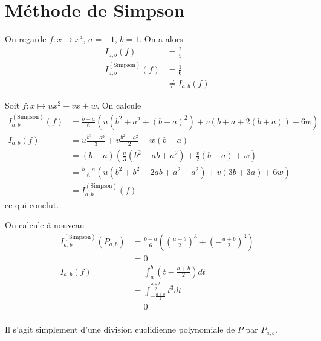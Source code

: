 
\section*{Méthode de Simpson}

\ques On regarde $ f: x \mapsto x^4 $, $ a=-1 $, $ b=1 $. On a alors 
\begin{align*}
    I_{a, b}(f) &= \frac{2}{5}\\
    I^{(\textrm{Simpson})}_{a, b}(f) &= \frac{1}{6}\\
                                     &\neq I_{a, b}(f)
\end{align*}

\ques Soit $ f : x \mapsto ux^2 + vx + w $. On calcule 
\begin{align*}
    I^{(\textrm{Simpson})}_{a, b}(f) &= \frac{b-a}{6} \left( u(b^2 + a^2 + (b+a)^2) + v(b + a + 2(b+a)) + 6w \right)\\
    I_{a, b}(f) &= u \frac{b^3 - a^3}{3} + v \frac{b^2-a^2}{2} + w(b-a)\\
                &= (b-a) \left( \frac{u}{3}(b^2 - ab + a^2) + \frac{v}{2}(b+a) + w \right)\\
                &= \frac{b-a}{6} \left( u(b^2 + b^2 - 2ab + a^2 + a^2) + v(3b+3a) + 6w \right)\\
                &= I^{(\textrm{Simpson})}_{a, b}(f)
\end{align*}
ce qui conclut.

\quessques On calcule à nouveau 
\begin{align*}
    I^{(\textrm{Simpson})}_{a, b}(P_{a,b}) &= \frac{b-a}{6}((\frac{a+b}{2})^3 + (-\frac{a+b}{2})^3) \\
                                           &= 0\\
    I_{a, b}(f) &= \int_{a}^{b} (t - \frac{a+b}{2})dt\\
                &= \int_{-\frac{a+b}{2}}^{\frac{a+b}{2}} t^3dt \\
                &= 0\\
\end{align*}

\ssques Il s'agit simplement d'une division euclidienne polynomiale de $ P $ par $ P_{a,b} $.

